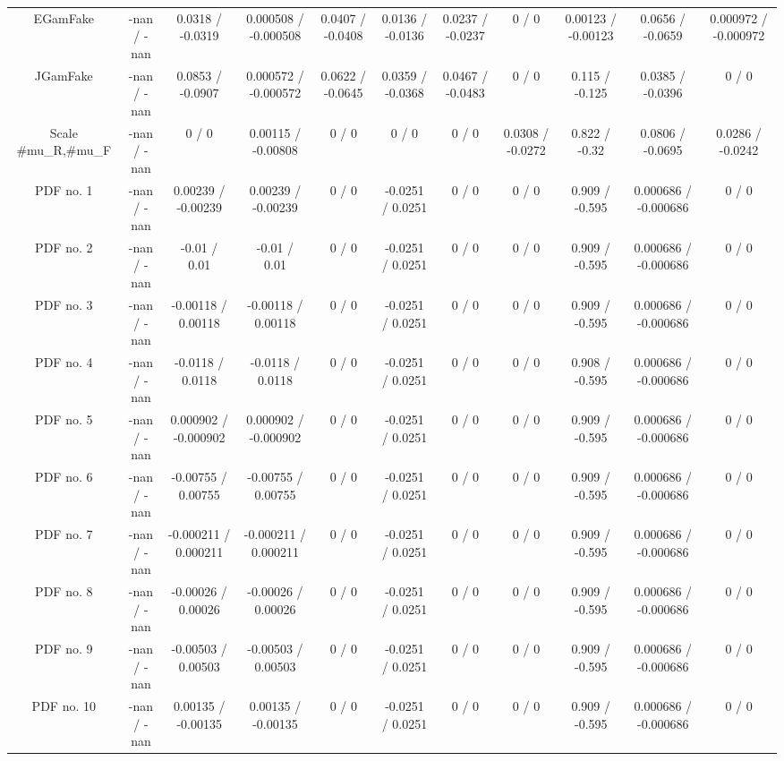 \begin{table}[htbp]
\begin{center}
\begin{tabular}{|c|c|c|c|c|c|c|c|c|c|c|}
  EGamFake & -nan / -nan & 0.0318 / -0.0319 & 0.000508 / -0.000508 & 0.0407 / -0.0408 & 0.0136 / -0.0136 & 0.0237 / -0.0237 & 0 / 0 & 0.00123 / -0.00123 & 0.0656 / -0.0659 & 0.000972 / -0.000972 \\ 
  JGamFake & -nan / -nan & 0.0853 / -0.0907 & 0.000572 / -0.000572 & 0.0622 / -0.0645 & 0.0359 / -0.0368 & 0.0467 / -0.0483 & 0 / 0 & 0.115 / -0.125 & 0.0385 / -0.0396 & 0 / 0 \\ 
  Scale #mu_{R},#mu_{F} & -nan / -nan & 0 / 0 & 0.00115 / -0.00808 & 0 / 0 & 0 / 0 & 0 / 0 & 0.0308 / -0.0272 & 0.822 / -0.32 & 0.0806 / -0.0695 & 0.0286 / -0.0242 \\ 
  PDF no. 1 & -nan / -nan & 0.00239 / -0.00239 & 0.00239 / -0.00239 & 0 / 0 & -0.0251 / 0.0251 & 0 / 0 & 0 / 0 & 0.909 / -0.595 & 0.000686 / -0.000686 & 0 / 0 \\ 
  PDF no. 2 & -nan / -nan & -0.01 / 0.01 & -0.01 / 0.01 & 0 / 0 & -0.0251 / 0.0251 & 0 / 0 & 0 / 0 & 0.909 / -0.595 & 0.000686 / -0.000686 & 0 / 0 \\ 
  PDF no. 3 & -nan / -nan & -0.00118 / 0.00118 & -0.00118 / 0.00118 & 0 / 0 & -0.0251 / 0.0251 & 0 / 0 & 0 / 0 & 0.909 / -0.595 & 0.000686 / -0.000686 & 0 / 0 \\ 
  PDF no. 4 & -nan / -nan & -0.0118 / 0.0118 & -0.0118 / 0.0118 & 0 / 0 & -0.0251 / 0.0251 & 0 / 0 & 0 / 0 & 0.908 / -0.595 & 0.000686 / -0.000686 & 0 / 0 \\ 
  PDF no. 5 & -nan / -nan & 0.000902 / -0.000902 & 0.000902 / -0.000902 & 0 / 0 & -0.0251 / 0.0251 & 0 / 0 & 0 / 0 & 0.909 / -0.595 & 0.000686 / -0.000686 & 0 / 0 \\ 
  PDF no. 6 & -nan / -nan & -0.00755 / 0.00755 & -0.00755 / 0.00755 & 0 / 0 & -0.0251 / 0.0251 & 0 / 0 & 0 / 0 & 0.909 / -0.595 & 0.000686 / -0.000686 & 0 / 0 \\ 
  PDF no. 7 & -nan / -nan & -0.000211 / 0.000211 & -0.000211 / 0.000211 & 0 / 0 & -0.0251 / 0.0251 & 0 / 0 & 0 / 0 & 0.909 / -0.595 & 0.000686 / -0.000686 & 0 / 0 \\ 
  PDF no. 8 & -nan / -nan & -0.00026 / 0.00026 & -0.00026 / 0.00026 & 0 / 0 & -0.0251 / 0.0251 & 0 / 0 & 0 / 0 & 0.909 / -0.595 & 0.000686 / -0.000686 & 0 / 0 \\ 
  PDF no. 9 & -nan / -nan & -0.00503 / 0.00503 & -0.00503 / 0.00503 & 0 / 0 & -0.0251 / 0.0251 & 0 / 0 & 0 / 0 & 0.909 / -0.595 & 0.000686 / -0.000686 & 0 / 0 \\ 
  PDF no. 10 & -nan / -nan & 0.00135 / -0.00135 & 0.00135 / -0.00135 & 0 / 0 & -0.0251 / 0.0251 & 0 / 0 & 0 / 0 & 0.909 / -0.595 & 0.000686 / -0.000686 & 0 / 0 \\ 

\end{tabular}
\end{center}
\end{table}
